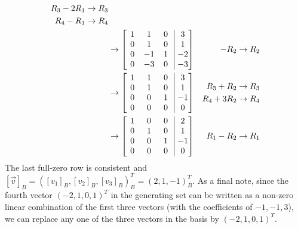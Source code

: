\begin{solution}
\begin{align*}
\begin{aligned}
R_3 - 2R_1 &\to R_3 \\
R_4 - R_1 &\to R_4
\end{aligned} \\
&\to
\left[\begin{array}{@{\,}wc{10pt}wc{10pt}wc{10pt}|wc{10pt}@{\,}}
1 & 1 & 0 & 3 \\
0 & 1 & 0 & 1\\
0 & -1 & 1 & -2\\
0 & -3 & 0 & -3 
\end{array}\right]
& -R_2 \to R_2 \\
&\to
\left[\begin{array}{@{\,}wc{10pt}wc{10pt}wc{10pt}|wc{10pt}@{\,}}
1 & 1 & 0 & 3 \\
0 & 1 & 0 & 1\\
0 & 0 & 1 & -1\\
0 & 0 & 0 & 0 
\end{array}\right]
& 
\begin{aligned}
R_3 + R_2 &\to R_3 \\
R_4 + 3R_2 &\to R_4
\end{aligned} \\
&\to
\left[\begin{array}{@{\,}wc{10pt}wc{10pt}wc{10pt}|wc{10pt}@{\,}}
1 & 0 & 0 & 2 \\
0 & 1 & 0 & 1\\
0 & 0 & 1 & -1\\
0 & 0 & 0 & 0 
\end{array}\right] 
& R_1 - R_2 \to R_1
\end{align*}
The last full-zero row is consistent and $[\vec{v}]_B = ([v_1]_B, [v_2]_B, [v_3]_B)_B^T = (2,1,-1)_B^T$. As a final note, since the fourth vector $(-2,1,0,1)^T$ in the generating set can be written as a non-zero linear combination of the first three vectors (with the coefficients of $-1,-1,3$), we can replace any one of the three vectors in the basis by $(-2,1,0,1)^T$.
\end{solution}

